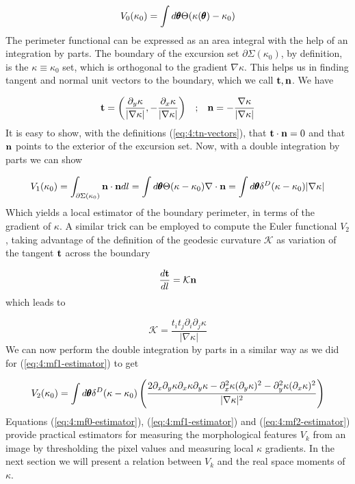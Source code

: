 \begin{equation}
\label{eq:4:mf0-estimator}
V_0(\kappa_0) = \int d\pmb{\theta} \Theta(\kappa(\pmb{\theta})-\kappa_0)
\end{equation} 
%
The perimeter functional can be expressed as an area integral with the help of an integration by parts. The boundary of the excursion set $\partial \Sigma(\kappa_0)$, by definition, is the $\kappa\equiv\kappa_0$ set, which is orthogonal to the gradient $\nabla \kappa$. This helps us in finding tangent and normal unit vectors to the boundary, which we call $\mathbf{t},\mathbf{n}$. We have

\begin{equation}
\label{eq:4:tn-vectors}
\begin{matrix}
\displaystyle \mathbf{t} = \left(\frac{\partial_y \kappa}{\vert\nabla\kappa\vert},-\frac{\partial_x \kappa}{\vert\nabla\kappa\vert}\right) & ; & \displaystyle \mathbf{n} = -\frac{\nabla \kappa}{\vert\nabla\kappa\vert} 
\end{matrix}
\end{equation} 
%
It is easy to show, with the definitions (\ref{eq:4:tn-vectors}), that $\mathbf{t}\cdot\mathbf{n}=0$ and that $\mathbf{n}$ points to the exterior of the excursion set. Now, with a double integration by parts we can show

\begin{equation}
\label{eq:4:mf1-estimator}
V_1(\kappa_0) = \int_{\partial\Sigma(\kappa_0)}\mathbf{n}\cdot\mathbf{n}dl = \int d\pmb{\theta} \Theta(\kappa-\kappa_0) \nabla\cdot \mathbf{n} = \int d\pmb{\theta} \delta^D(\kappa-\kappa_0)\vert\nabla\kappa\vert
\end{equation}
%
Which yields a local estimator of the boundary perimeter, in terms of the gradient of $\kappa$. A similar trick can be employed to compute the Euler functional $V_2$, taking advantage of the definition of the geodesic curvature $\mathcal{K}$ as variation of the tangent $\mathbf{t}$ across the boundary

\begin{equation}
\label{eq:4:geocurv}
\frac{d\mathbf{t}}{dl} = \mathcal{K}\mathbf{n}
\end{equation}
%
which leads to 

\begin{equation}
\label{eq:4:geocurv-2}
\mathcal{K} = \frac{t_it_j\partial_i\partial_j\kappa}{\vert\nabla\kappa\vert}
\end{equation}
%
We can now perform the double integration by parts in a similar way as we did for (\ref{eq:4:mf1-estimator}) to get

\begin{equation}
\label{eq:4:mf2-estimator}
V_2(\kappa_0) = \int d\pmb{\theta} \delta^D(\kappa-\kappa_0)\left(\frac{2\partial_x\partial_y\kappa\partial_x\kappa\partial_y\kappa-\partial^2_x\kappa(\partial_y\kappa)^2-\partial_y^2\kappa(\partial_x\kappa)^2}{\vert\nabla\kappa\vert^2}\right)
\end{equation}
%
Equations (\ref{eq:4:mf0-estimator}), (\ref{eq:4:mf1-estimator}) and (\ref{eq:4:mf2-estimator}) provide practical estimators for measuring the morphological features $V_k$ from an image by thresholding the pixel values and measuring local $\kappa$ gradients. In the next section we will present a relation between $V_k$ and the real space moments of $\kappa$.  


